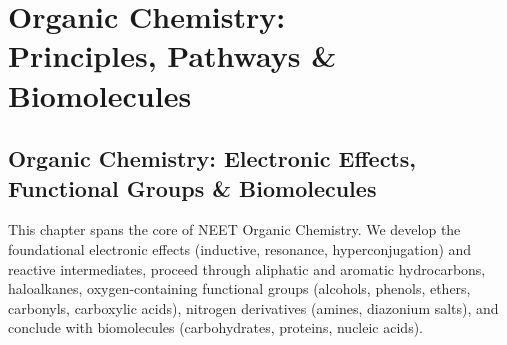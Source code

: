 \documentclass[10pt,twoside,openright]{book}
\begin{document}
\part[Organic Chemistry: Principles, Pathways \& Biomolecules]{Organic Chemistry:\\[6pt]Principles, Pathways \& Biomolecules}

\chapter{Organic Chemistry: Electronic Effects, Functional Groups \& Biomolecules}

This chapter spans the core of NEET Organic Chemistry. We develop the foundational electronic effects (inductive, resonance, hyperconjugation) and reactive intermediates, proceed through aliphatic and aromatic hydrocarbons, haloalkanes, oxygen-containing functional groups (alcohols, phenols, ethers, carbonyls, carboxylic acids), nitrogen derivatives (amines, diazonium salts), and conclude with biomolecules (carbohydrates, proteins, nucleic acids).
\end{document}
